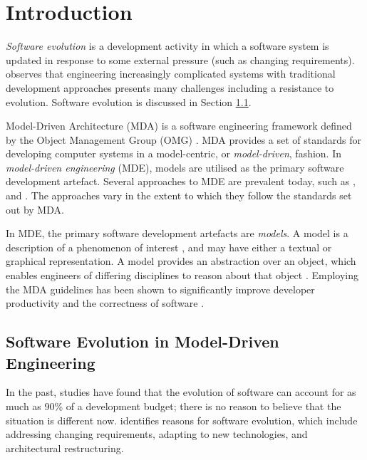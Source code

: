 

\section{Introduction}
\textit{Software evolution} is a development activity in which a software system is updated in response to some external pressure (such as changing requirements). \cite{brooks86nosilverbullet} observes that engineering increasingly complicated systems with traditional development approaches presents many challenges including a resistance to evolution. Software evolution is discussed in Section \ref{sub:software_evo}.

Model-Driven Architecture (MDA) is a software engineering framework defined by the Object Management
Group (OMG) \cite{omg}. MDA provides a set of standards for developing computer systems in a model-centric, or \textit{model-driven}, fashion. In \textit{model-driven engineering} (MDE), models are utilised as the primary software development artefact. Several approaches to MDE are prevalent today, such as \cite{stahl06mdsd}, \cite{kelly08dsm} and \cite{greenfield04software}. The approaches vary in the extent to which they follow the standards set out by MDA.

In MDE, the primary software development artefacts are \textit{models}. A model is a description of a phenomenon of interest \cite{jackson96software}, and may have either a textual or graphical representation. A model provides an abstraction over an object, which enables engineers of differing disciplines to reason about that object \cite{kolovos06eol}. Employing the MDA guidelines has been shown to significantly improve developer productivity and the correctness of software \cite{watson08mdahistory}.

\subsection{Software Evolution in Model-Driven Engineering}
\label{sub:software_evo}
In the past, studies \cite{erlikh00leveraging,moad90maintaining} have found that the evolution of software can account for as much as 90\% of a development budget; there is no reason to believe that the situation is different now. \cite{sjoberg93quantifying} identifies reasons for software evolution, which include addressing changing requirements, adapting to new technologies, and architectural restructuring.

